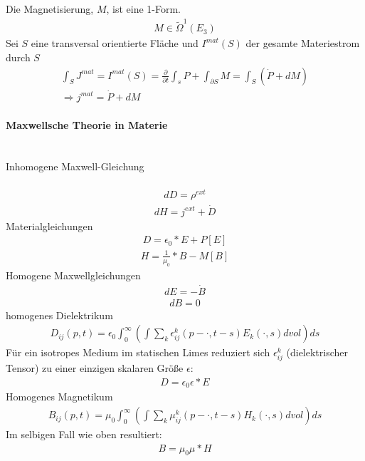 \documentclass[10pt,a4paper]{article}
\begin{document}
Die Magnetisierung, $M$, ist eine 1-Form.
\begin{align}
M \in \tilde{\Omega}^1(E_3)
\end{align}
Sei $S$ eine transversal orientierte Fläche und $I^{mat}(S)$ der gesamte Materiestrom durch $S$
\begin{align}
\int_S J^{mat} = I ^{mat}(S) = \frac{\partial}{\partial t} \int_s P + \int_{\partial S} M= \int_S (\dot{P} +dM)\\
\Rightarrow j^{mat}= \dot{P} + dM
\end{align}
\paragraph{Maxwellsche Theorie in Materie} $\,$ \\
\\
Inhomogene Maxwell-Gleichung \\
\\
\begin{align}
dD=\rho^{ext}
\end{align}
\begin{align}
dH=j^{ext} + \dot{D}
\end{align}
Materialgleichungen
\begin{align}
D= \epsilon_0 * E + P[E]
\end{align}
\begin{align}
H=\frac{1}{\mu_0} * B - M[B]
\end{align}
Homogene Maxwellgleichungen
\begin{align}
dE=-\dot{B}
\end{align}
\begin{align}
dB=0
\end{align}
homogenes Dielektrikum
\begin{align}
D_{ij} (p,t)= \epsilon_0 \int_0^{\infty}
(\int \sum_k \epsilon_{ij}^k (p-\cdot , t-s) E_k (\cdot , s) dvol)ds 
\end{align}
Für ein isotropes Medium im statischen Limes reduziert sich $ \epsilon_{ij}^k$ (dielektrischer Tensor) zu einer einzigen skalaren Größe $ \epsilon $:
\begin{align}
D=\epsilon_0 \epsilon * E
\end{align}
Homogenes Magnetikum
\begin{align}
B_{ij} (p,t)= \mu_0 \int_0^{\infty} ( \int \sum_k \mu_{ij}^k (p- \cdot , t-s) H_k (\cdot ,s)dvol)ds
\end{align}
Im selbigen Fall wie oben resultiert:
\begin{align}
B= \mu_0 \mu *H
\end{align}
\end{document}
